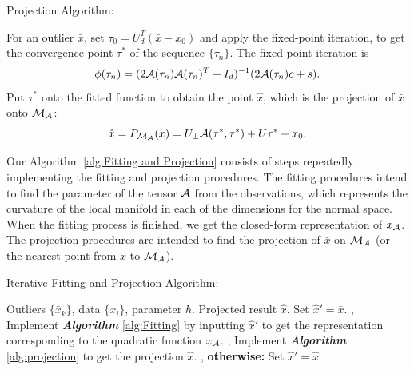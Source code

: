 \documentclass{article}
\theoremstyle{remark}
\begin{document}
\begin{algorithm}[ht]
\caption{Projection Algorithm:}
\label{alg:projection}
\begin{small}
\begin{algorithmic}
\STATE [1.] For an outlier $\bar{x}$, set $\tau_0 = U_d^T(\bar{x}-x_0)$ and apply the fixed-point iteration, to get the convergence point $\tau^*$ of the sequence $\{\tau_n\}$. The fixed-point iteration is
\[
 \phi(\tau_{n})=( 2{\cal A}(\tau_{n}){\cal A}(\tau_{n})^T+ I_d)^{-1} (2{\cal A}(\tau_{n})c+ s).
\]
\STATE [2.] Put $\tau^*$ onto the fitted function  to obtain the point $\hat{x}$, which is the projection of $\bar{x}$ onto ${\cal M}_{\cal A}$:
\[
\hat{x} = P_{\cal M_A} (x) =  U_{\perp} {\cal A} (\tau^*,\tau^*) + U \tau^* +x_0.
\]
\end{algorithmic}
\end{small}
\end{algorithm}
Our Algorithm \ref{alg:Fitting and Projection} consists of steps repeatedly implementing the fitting and projection procedures. The fitting procedures intend to find the parameter of the tensor $\cal A$ from the observations, which represents the curvature of the local manifold in each of the dimensions for the normal space. When the fitting process is finished, we get the closed-form representation of $x_{\cal A}$. The projection procedures are intended to find the projection of $\bar{x}$ on $\cal M_A$ (or the nearest point from  $\bar{x}$ to $\cal M_A$). %
\begin{algorithm}[ht]
\caption{Iterative Fitting and Projection Algorithm:}
\label{alg:Fitting and Projection}
\begin{small}
\begin{algorithmic}
 Outliers $\{\bar{x}_k\}$, data $\{x_i\}$, parameter $h$.
 Projected result $\hat{x}$.
\STATE Set $\hat{x}' = \bar{x}$.
\REPEAT
{}, Implement {\bfseries {\it  Algorithm}} \ref{alg:Fitting} by inputting $\hat{x}'$ to get the representation corresponding to the quadratic function $x_{\cal A}$.
, Implement {\bfseries {\it  Algorithm}} \ref{alg:projection} to get the projection $\hat{x}$.
, {\bfseries otherwise:} Set $\hat{x}'=\hat{x}$
\ENDFOR
\end{algorithmic}
\end{small}
\end{algorithm}
\end{document}
